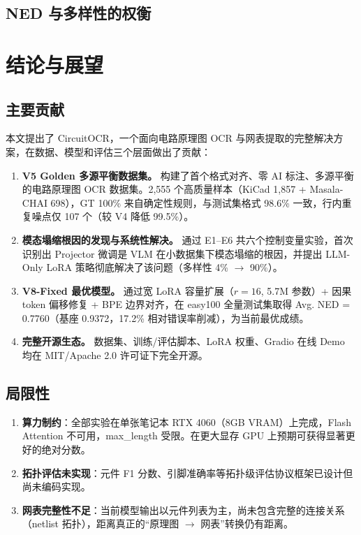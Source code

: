 \subsection{NED 与多样性的权衡}



\section{结论与展望}

\subsection{主要贡献}

本文提出了 CircuitOCR，一个面向电路原理图 OCR 与网表提取的完整解决方案，在数据、模型和评估三个层面做出了贡献：

\begin{enumerate}
    \item \textbf{V5 Golden 多源平衡数据集。} 构建了首个格式对齐、零 AI 标注、多源平衡的电路原理图 OCR 数据集。2,555 个高质量样本（KiCad 1,857 + Masala-CHAI 698），GT 100\% 来自确定性规则，与测试集格式 98.6\% 一致，行内重复噪点仅 107 个（较 V4 降低 99.5\%）。
    \item \textbf{模态塌缩根因的发现与系统性解决。} 通过 E1--E6 共六个控制变量实验，首次识别出 Projector 微调是 VLM 在小数据集下模态塌缩的根因，并提出 LLM-Only LoRA 策略彻底解决了该问题（多样性 4\% $\to$ 90\%）。
    \item \textbf{V8-Fixed 最优模型。} 通过宽 LoRA 容量扩展（$r=16$, 5.7M 参数）+ 因果 token 偏移修复 + BPE 边界对齐，在 easy100 全量测试集取得 Avg. NED = 0.7760（基座 0.9372，17.2\% 相对错误率削减），为当前最优成绩。
    \item \textbf{完整开源生态。} 数据集、训练/评估脚本、LoRA 权重、Gradio 在线 Demo 均在 MIT/Apache 2.0 许可证下完全开源。
\end{enumerate}

\subsection{局限性}

\begin{enumerate}
    \item \textbf{算力制约}：全部实验在单张笔记本 RTX 4060（8GB VRAM）上完成，Flash Attention 不可用，max\_length 受限。在更大显存 GPU 上预期可获得显著更好的绝对分数。
    \item \textbf{拓扑评估未实现}：元件 F1 分数、引脚准确率等拓扑级评估协议框架已设计但尚未编码实现。
    \item \textbf{网表完整性不足}：当前模型输出以元件列表为主，尚未包含完整的连接关系（netlist 拓扑），距离真正的``原理图 $\to$ 网表''转换仍有距离。
\end{enumerate}

